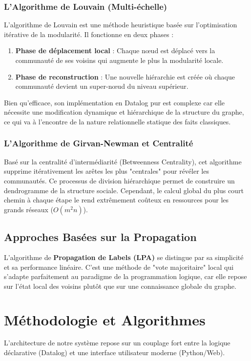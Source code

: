 \documentclass[12pt,a4paper]{report}
\begin{document}
\subsection{L'Algorithme de Louvain (Multi-échelle)}
L'algorithme de Louvain est une méthode heuristique basée sur l'optimisation itérative de la modularité. Il fonctionne en deux phases :
\begin{enumerate}
    \item \textbf{Phase de déplacement local} : Chaque nœud est déplacé vers la communauté de ses voisins qui augmente le plus la modularité locale.
    \item \textbf{Phase de reconstruction} : Une nouvelle hiérarchie est créée où chaque communauté devient un super-nœud du niveau supérieur.
\end{enumerate}
Bien qu'efficace, son implémentation en Datalog pur est complexe car elle nécessite une modification dynamique et hiérarchique de la structure du graphe, ce qui va à l'encontre de la nature relationnelle statique des faits classiques.

\subsection{L'Algorithme de Girvan-Newman et Centralité}
Basé sur la centralité d'intermédiarité (Betweenness Centrality), cet algorithme supprime itérativement les arêtes les plus "centrales" pour révéler les communautés. Ce processus de division hiérarchique permet de construire un dendrogramme de la structure sociale. Cependant, le calcul global du plus court chemin à chaque étape le rend extrêmement coûteux en ressources pour les grands réseaux ($O(m^2n)$).

\section{Approches Basées sur la Propagation}
L'algorithme de \textbf{Propagation de Labels (LPA)} se distingue par sa simplicité et sa performance linéaire. C'est une méthode de "vote majoritaire" local qui s'adapte parfaitement au paradigme de la programmation logique, car elle repose sur l'état local des voisins plutôt que sur une connaissance globale du graphe.

\chapter{Méthodologie et Algorithmes}
L'architecture de notre système repose sur un couplage fort entre la logique déclarative (Datalog) et une interface utilisateur moderne (Python/Web).
\end{document}
